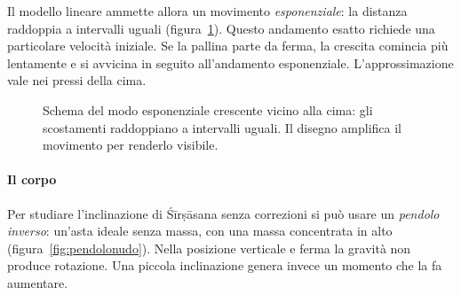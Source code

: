 \documentclass[11pt,a4paper,twoside=false,headinclude,footinclude]{scrartcl}
\begin{document}
Il modello lineare ammette allora un movimento \emph{esponenziale}: la distanza raddoppia a intervalli uguali (figura~\ref{fig:collepalline}). Questo andamento esatto richiede una particolare velocità iniziale. Se la pallina parte da ferma, la crescita comincia più lentamente e si avvicina in seguito all'andamento esponenziale. L'approssimazione vale nei pressi della cima.

\begin{figure}[htbp]
\centering
{}
\caption{Schema del modo esponenziale crescente vicino alla cima: gli scostamenti raddoppiano a intervalli uguali. Il disegno amplifica il movimento per renderlo visibile.}
\label{fig:collepalline}
\end{figure}

\paragraph{Il corpo} Per studiare l'inclinazione di Śīrṣāsana senza correzioni si può usare un \emph{pendolo inverso}: un'asta ideale senza massa, con una massa concentrata in alto (figura~\ref{fig:pendolonudo}). Nella posizione verticale e ferma la gravità non produce rotazione. Una piccola inclinazione genera invece un momento che la fa aumentare.
\end{document}
